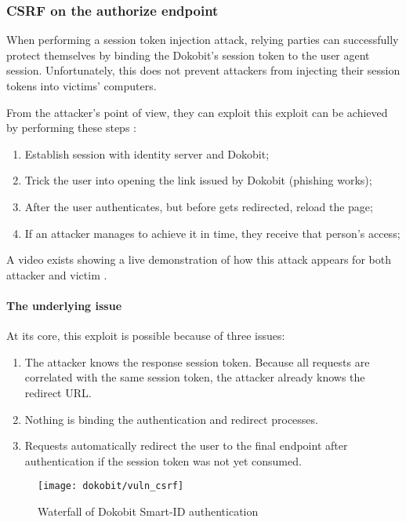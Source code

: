 \subsubsection{CSRF on the authorize endpoint}

When performing a session token injection attack, relying parties can successfully protect themselves by binding the Dokobit's session token to the user agent session. Unfortunately, this does not prevent attackers from injecting their session tokens into victims' computers.

From the attacker's point of view, they can exploit this exploit can be achieved by performing these steps \cite{video-exploitdokobit}:

\begin{enumerate}
  \item Establish session with identity server and Dokobit;
  \item Trick the user into opening the link issued by Dokobit (phishing works);
  \item After the user authenticates, but before gets redirected, reload the page;
  \item If an attacker manages to achieve it in time, they receive that person's access;
\end{enumerate}

A video exists showing a live demonstration of how this attack appears for both attacker and victim \cite{video-exploitdokobit}.

\paragraph{The underlying issue}

At its core, this exploit is possible because of three issues: 

\begin{enumerate}
  \item The attacker knows the response session token. Because all requests are correlated with the same session token, the attacker already knows the redirect URL.
  \item Nothing is binding the authentication and redirect processes.
  \item Requests automatically redirect the user to the final endpoint after authentication if the session token was not yet consumed.
\end{enumerate}

\begin{figure}
  \centering
  \texttt{[image: dokobit/vuln\_csrf]}
  \caption{Waterfall of Dokobit Smart-ID authentication}
  \label{fig:dokobit-vuln-csrf}
\end{figure}

